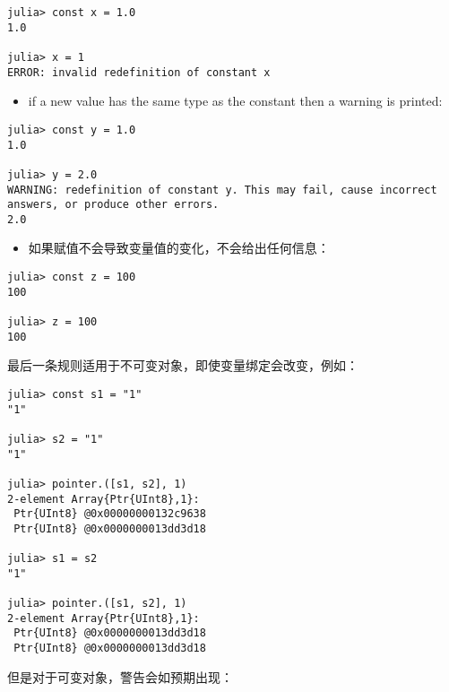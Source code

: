 \begin{verbatim}
julia> const x = 1.0
1.0

julia> x = 1
ERROR: invalid redefinition of constant x
\end{verbatim}



\begin{itemize}
\item if a new value has the same type as the constant then a warning is printed:

\end{itemize}



\begin{verbatim}
julia> const y = 1.0
1.0

julia> y = 2.0
WARNING: redefinition of constant y. This may fail, cause incorrect answers, or produce other errors.
2.0
\end{verbatim}



\begin{itemize}
\item 如果赋值不会导致变量值的变化，不会给出任何信息：

\end{itemize}



\begin{verbatim}
julia> const z = 100
100

julia> z = 100
100
\end{verbatim}



最后一条规则适用于不可变对象，即使变量绑定会改变，例如：




\begin{verbatim}
julia> const s1 = "1"
"1"

julia> s2 = "1"
"1"

julia> pointer.([s1, s2], 1)
2-element Array{Ptr{UInt8},1}:
 Ptr{UInt8} @0x00000000132c9638
 Ptr{UInt8} @0x0000000013dd3d18

julia> s1 = s2
"1"

julia> pointer.([s1, s2], 1)
2-element Array{Ptr{UInt8},1}:
 Ptr{UInt8} @0x0000000013dd3d18
 Ptr{UInt8} @0x0000000013dd3d18
\end{verbatim}



但是对于可变对象，警告会如预期出现：




